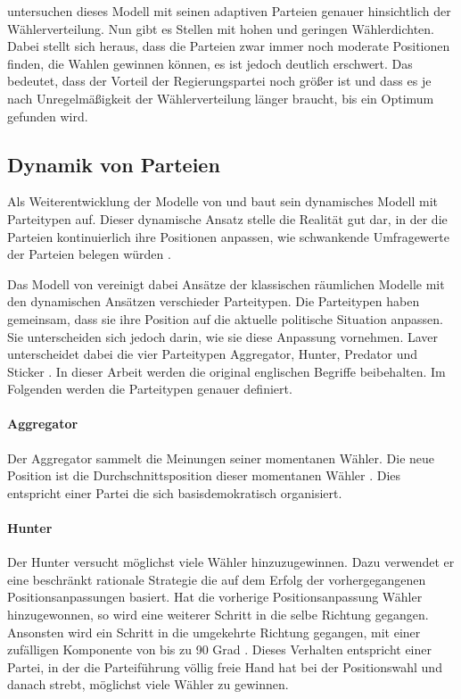 \citet{kollman1998political} untersuchen dieses Modell mit seinen adaptiven Parteien genauer hinsichtlich der Wählerverteilung. Nun gibt es Stellen mit hohen und geringen Wählerdichten. Dabei stellt sich heraus, dass die Parteien zwar immer noch moderate Positionen finden, die Wahlen gewinnen können, es ist jedoch deutlich erschwert. Das bedeutet, dass der Vorteil der Regierungspartei noch größer ist und dass es je nach Unregelmäßigkeit der Wählerverteilung länger braucht, bis ein Optimum gefunden wird. \citep{kollman1998political}

\subsection{Dynamik von Parteien} \label{sec:ABM-Dynamik}

Als Weiterentwicklung der Modelle von \citet{kollman1992adaptive} und \citet{kollman1998political} baut \citet{laver2005policy} sein dynamisches Modell mit Parteitypen auf.
Dieser dynamische Ansatz stelle die Realität gut dar, in der die Parteien kontinuierlich ihre Positionen anpassen, wie schwankende Umfragewerte der Parteien belegen würden \citep[S.\,263-264]{laver2005policy}.

Das Modell von \citet{laver2005policy} vereinigt dabei Ansätze der klassischen räumlichen Modelle mit den dynamischen Ansätzen verschieder Parteitypen. Die Parteitypen haben gemeinsam, dass sie ihre Position auf die aktuelle politische Situation anpassen. Sie unterscheiden sich jedoch darin, wie sie diese Anpassung vornehmen. Laver unterscheidet dabei die vier Parteitypen Aggregator, Hunter, Predator und Sticker \citep[S.\,266-267]{laver2005policy}. In dieser Arbeit werden die original englischen Begriffe beibehalten. Im Folgenden werden die Parteitypen genauer definiert.

\paragraph{Aggregator} Der Aggregator sammelt die Meinungen seiner momentanen Wähler. Die neue Position ist die Durchschnittsposition dieser momentanen Wähler \citep[S.\,267]{laver2005policy}. Dies entspricht einer Partei die sich basisdemokratisch organisiert.

\paragraph{Hunter} Der Hunter versucht möglichst viele Wähler hinzuzugewinnen. Dazu verwendet er eine beschränkt rationale Strategie die auf dem Erfolg der vorhergegangenen Positionsanpassungen basiert. Hat die vorherige Positionsanpassung Wähler hinzugewonnen, so wird eine weiterer Schritt in die selbe Richtung gegangen. Ansonsten wird ein Schritt in die umgekehrte Richtung gegangen, mit einer zufälligen Komponente von bis zu 90 Grad \citep[S.\,267]{laver2005policy}. Dieses Verhalten entspricht einer Partei, in der die Parteiführung völlig freie Hand hat bei der Positionswahl und danach strebt, möglichst viele Wähler zu gewinnen.

